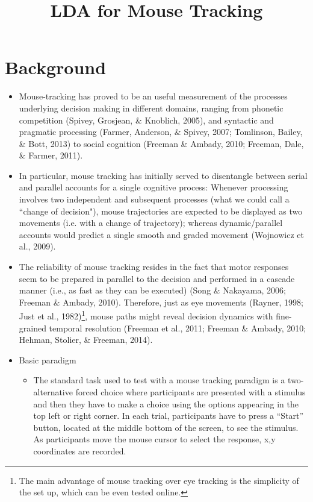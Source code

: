 \documentclass{article}
\title{LDA for Mouse Tracking}
\newcommand{\addMM}[1]{{\leavevmode\color{red}#1}}
\begin{document}
\maketitle

\section{Background}

\begin{itemize}

\item Mouse-tracking has proved to be an useful measurement of the processes underlying decision making in different domains, ranging from phonetic competition (Spivey, Grosjean, \& Knoblich, 2005), and syntactic and pragmatic processing (Farmer, Anderson, \& Spivey, 2007; Tomlinson, Bailey, \& Bott, 2013) to social cognition (Freeman \& Ambady, 2010; Freeman, Dale, \& Farmer, 2011). 

\item In particular, mouse tracking has initially served to disentangle between serial and parallel accounts for a single cognitive process: Whenever processing involves two independent and subsequent processes \addMM{(what we could call a ``change of decision")}, mouse trajectories are expected to be displayed as two movements (i.e. with a change of trajectory); whereas dynamic/parallel accounts would predict a single smooth and graded movement (Wojnowicz et al., 2009).  

\item The reliability of mouse tracking resides in the fact that motor responses seem to be prepared in parallel to the decision and performed in a cascade manner (i.e., as fast as they can be executed) (Song \& Nakayama, 2006; Freeman \& Ambady, 2010). Therefore, just as eye movements (Rayner, 1998; Just et al., 1982)\footnote{The main advantage of mouse tracking over eye tracking is the simplicity of the set up, which can be even tested online.}, mouse paths might reveal decision dynamics with fine-grained temporal resolution (Freeman et al., 2011; Freeman \& Ambady, 2010; Hehman, Stolier, \& Freeman, 2014).  

\item Basic paradigm

\begin{itemize}

\item The standard task used to test with a mouse tracking paradigm is a two-alternative forced choice where participants are presented with a stimulus and then they have to make a choice using the options appearing in the top left or right corner. In each trial, participants have to press a “Start” button, located at the middle bottom of the screen, to see the stimulus. As participants move the mouse cursor to select the response, x,y coordinates are recorded. 


\end{itemize}
\end{itemize}
\end{document}
